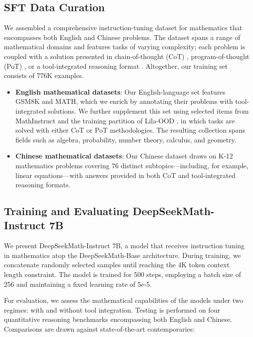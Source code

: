 \begin{itemize}[topsep=0pt]
\subsection{SFT Data Curation}

We assembled a comprehensive instruction-tuning dataset for mathematics that encompasses both English and Chinese problems. The dataset spans a range of mathematical domains and features tasks of varying complexity; each problem is coupled with a solution presented in chain-of-thought (CoT) \citep{cot}, program-of-thought (PoT) \citep{pot,pal}, or a tool-integrated reasoning format \citep{tora}. Altogether, our training set consists of 776K examples.

\begin{itemize}[topsep=0pt]
    \item \textbf{English mathematical datasets}: Our English-language set features GSM8K and MATH, which we enrich by annotating their problems with tool-integrated solutions. We further supplement this set using selected items from MathInstruct \citep{MathInstruct} and the training partition of Lila-OOD \citep{lila}, in which tasks are solved with either CoT or PoT methodologies. The resulting collection spans fields such as algebra, probability, number theory, calculus, and geometry.
    \item \textbf{Chinese mathematical datasets}: Our Chinese dataset draws on K-12 mathematics problems covering 76 distinct subtopics—including, for example, linear equations—with answers provided in both CoT and tool-integrated reasoning formats.
\end{itemize}

\subsection{Training and Evaluating DeepSeekMath-Instruct 7B}

We present DeepSeekMath-Instruct 7B, a model that receives instruction tuning in mathematics atop the DeepSeekMath-Base architecture. During training, we concatenate randomly selected samples until reaching the 4K token context length constraint. The model is trained for 500 steps, employing a batch size of 256 and maintaining a fixed learning rate of 5e-5.

For evaluation, we assess the mathematical capabilities of the models under two regimes: with and without tool integration. Testing is performed on four quantitative reasoning benchmarks encompassing both English and Chinese. Comparisons are drawn against state-of-the-art contemporaries:


\end{itemize}
